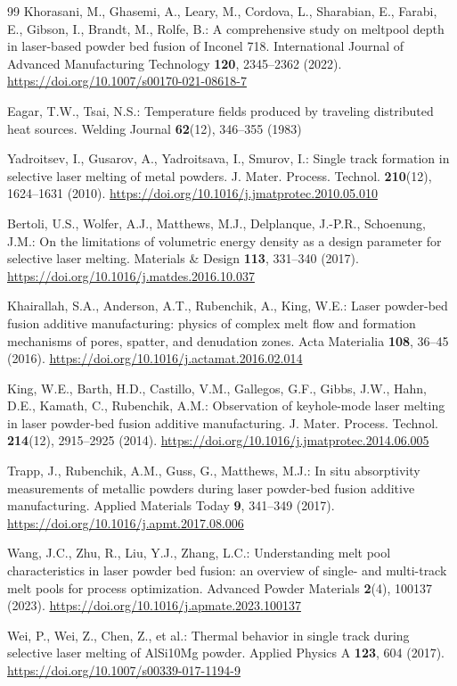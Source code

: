 \documentclass[12pt]{article}
\begin{document}
\begin{thebibliography}{99}
Khorasani, M., Ghasemi, A., Leary, M., Cordova, L., Sharabian, E., Farabi, E., Gibson, I., Brandt, M., Rolfe, B.: A comprehensive study on meltpool depth in laser-based powder bed fusion of Inconel 718. International Journal of Advanced Manufacturing Technology \textbf{120}, 2345--2362 (2022). \url{https://doi.org/10.1007/s00170-021-08618-7}

Eagar, T.W., Tsai, N.S.: Temperature fields produced by traveling distributed heat sources. Welding Journal \textbf{62}(12), 346--355 (1983)

Yadroitsev, I., Gusarov, A., Yadroitsava, I., Smurov, I.: Single track formation in selective laser melting of metal powders. J. Mater. Process. Technol. \textbf{210}(12), 1624--1631 (2010). \url{https://doi.org/10.1016/j.jmatprotec.2010.05.010}

Bertoli, U.S., Wolfer, A.J., Matthews, M.J., Delplanque, J.-P.R., Schoenung, J.M.: On the limitations of volumetric energy density as a design parameter for selective laser melting. Materials \& Design \textbf{113}, 331--340 (2017). \url{https://doi.org/10.1016/j.matdes.2016.10.037}

Khairallah, S.A., Anderson, A.T., Rubenchik, A., King, W.E.: Laser powder-bed fusion additive manufacturing: physics of complex melt flow and formation mechanisms of pores, spatter, and denudation zones. Acta Materialia \textbf{108}, 36--45 (2016). \url{https://doi.org/10.1016/j.actamat.2016.02.014}

King, W.E., Barth, H.D., Castillo, V.M., Gallegos, G.F., Gibbs, J.W., Hahn, D.E., Kamath, C., Rubenchik, A.M.: Observation of keyhole-mode laser melting in laser powder-bed fusion additive manufacturing. J. Mater. Process. Technol. \textbf{214}(12), 2915--2925 (2014). \url{https://doi.org/10.1016/j.jmatprotec.2014.06.005}

Trapp, J., Rubenchik, A.M., Guss, G., Matthews, M.J.: In situ absorptivity measurements of metallic powders during laser powder-bed fusion additive manufacturing. Applied Materials Today \textbf{9}, 341--349 (2017). \url{https://doi.org/10.1016/j.apmt.2017.08.006}

Wang, J.C., Zhu, R., Liu, Y.J., Zhang, L.C.: Understanding melt pool characteristics in laser powder bed fusion: an overview of single- and multi-track melt pools for process optimization. Advanced Powder Materials \textbf{2}(4), 100137 (2023). \url{https://doi.org/10.1016/j.apmate.2023.100137}

Wei, P., Wei, Z., Chen, Z., et al.: Thermal behavior in single track during selective laser melting of AlSi10Mg powder. Applied Physics A \textbf{123}, 604 (2017). \url{https://doi.org/10.1007/s00339-017-1194-9}

\end{thebibliography}
\end{document}
